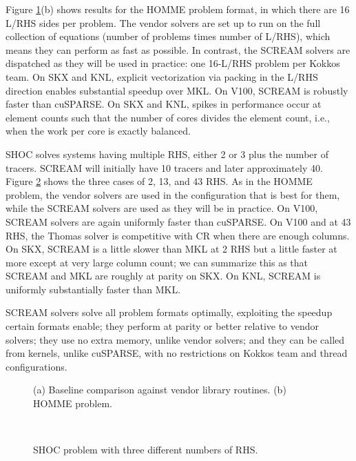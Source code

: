 \documentclass[10pt,twocolumn]{article}
\begin{document}
Figure \ref{fig:one}(b) shows results for the HOMME problem format,
in which there are 16 L/RHS sides per problem.
The vendor solvers are set up to run on the full collection of equations (number of problems times number of L/RHS),
which means they can perform as fast as possible.
In contrast, the SCREAM solvers are dispatched as they will be used in practice:
one 16-L/RHS problem per Kokkos team.
On SKX and KNL, explicit vectorization via packing in the L/RHS direction enables
substantial speedup over MKL.
On V100, SCREAM is robustly faster than cuSPARSE.
On SKX and KNL, spikes in performance occur at element counts such that the number of cores divides the element count, i.e., when the work per core is exactly balanced.

SHOC solves systems having multiple RHS, either 2 or 3 plus the number of tracers.
SCREAM will initially have 10 tracers and later approximately 40.
Figure \ref{fig:shoc} shows the three cases of 2, 13, and 43 RHS.
As in the HOMME problem, the vendor solvers are used in the configuration that is best for them,
while the SCREAM solvers are used as they will be in practice.
On V100, SCREAM solvers are again uniformly faster than cuSPARSE.
On V100 and at 43 RHS, the Thomas solver is competitive with CR when there are enough columns.
On SKX, SCREAM is a little slower than MKL at 2 RHS but a little faster at more except at very large column count;
we can summarize this as that SCREAM and MKL are roughly at parity on SKX.
On KNL, SCREAM is uniformly substantially faster than MKL.

 SCREAM solvers solve all problem formats optimally,
exploiting the speedup certain formats enable;
they perform at parity or better relative to vendor solvers;
they use no extra memory, unlike vendor solvers;
and they can be called from kernels, unlike cuSPARSE, with no restrictions on Kokkos team and thread configurations.

\onecolumn

\begin{figure}[hbt]
  \centering
  \caption{(a) Baseline comparison against vendor library routines.
  (b) HOMME problem.} \label{fig:one}
\end{figure}
\begin{figure}[hbt]
  \centering
   \\
  \caption{SHOC problem with three different numbers of RHS.} \label{fig:shoc}
\end{figure}
\clearpage
\end{document}
